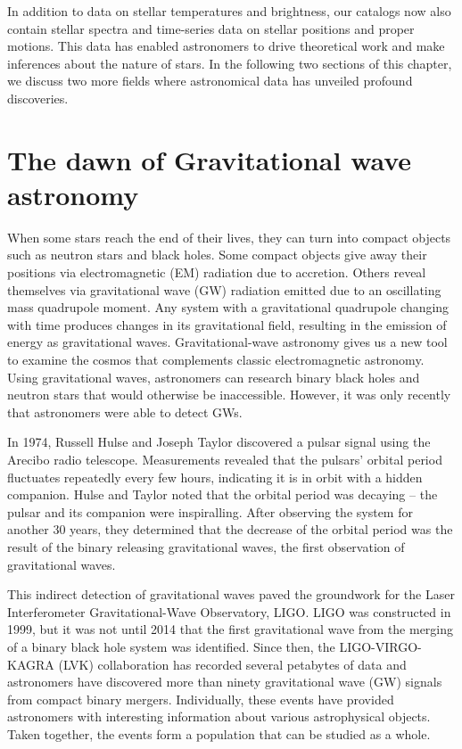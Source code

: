 In addition to data on stellar temperatures and brightness, our catalogs now also contain stellar spectra and time-series data on stellar positions and proper motions.
This data has enabled astronomers to drive theoretical work and make inferences about the nature of stars.
In the following two sections of this chapter, we discuss two more fields where astronomical data has unveiled profound discoveries. 



\section{The dawn of Gravitational wave astronomy}

When some stars reach the end of their lives, they can turn into compact objects such as neutron stars and black holes. 
Some compact objects give away their positions via electromagnetic (EM) radiation due to accretion. 
Others reveal themselves via gravitational wave (GW) radiation emitted due to an oscillating mass quadrupole moment.
Any system with a gravitational quadrupole changing with time produces changes in its gravitational field, resulting in the emission of energy as gravitational waves.
Gravitational-wave astronomy gives us a new tool to examine the cosmos that complements classic electromagnetic astronomy.
Using gravitational waves, astronomers can research binary black holes and neutron stars that would otherwise be inaccessible.
However, it was only recently that astronomers were able to detect GWs. 

In 1974, Russell Hulse and Joseph Taylor discovered a pulsar signal using the Arecibo radio telescope.
Measurements revealed that the pulsars' orbital period fluctuates repeatedly every few hours, indicating it is in orbit with a hidden companion.
Hulse and Taylor noted that the orbital period was decaying -- the pulsar and its companion were inspiralling.
After observing the system for another 30 years, they determined that the decrease of the orbital period was the result of the binary releasing gravitational waves, the first observation of gravitational waves.

This indirect detection of gravitational waves paved the groundwork for the Laser Interferometer Gravitational-Wave Observatory, LIGO. 
LIGO was constructed in 1999, but it was not until 2014 that the first gravitational wave from the merging of a binary black hole system was identified.
Since then, the LIGO-VIRGO-KAGRA (LVK) collaboration has recorded several petabytes of data and astronomers have discovered more than ninety gravitational wave (GW) signals from compact binary mergers.
Individually, these events have provided astronomers with interesting information about various astrophysical objects. 
Taken together, the events form a population that can be studied as a whole. 

